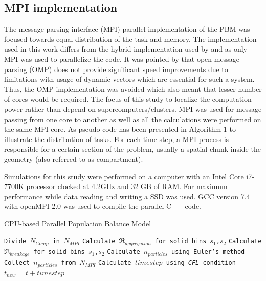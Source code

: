 \documentclass[preprint,10pt,authoryear,review]{elsarticle}
\begin{document}
\begin{linenumbers}
\subsection{MPI implementation}
The message parsing interface (MPI) parallel implementation of the PBM was 
focused towards equal distribution of the task and memory. The implementation 
used in this work differs from the hybrid implementation used by \citep{Bettencourt2017}
and \citep{Sampat2018} as only MPI was used to parallelize the code. It 
was pointed by \citep{Sampat2018} that open message parsing (OMP) does not 
provide significant speed improvements due to limitations with usage of 
dynamic vectors which are essential for such a system. Thus, the OMP 
implementation was avoided which also meant that lesser number of cores 
would be required. The focus of this study to localize the computation power 
rather than depend on supercomputers/clusters. MPI was used for message passing 
from one core to another as well as all the calculations  
were performed on the same MPI core. As pseudo code has been presented in Algorithm 1 
to illustrate the distribution of tasks. For each time step, a MPI process is responsible 
for a certain section of the problem, usually a spatial chunk inside the geometry 
(also referred to as compartment).  



Simulations for this study were performed on a computer with an Intel Core i7-7700K 
processor clocked at 4.2GHz and 32 GB of RAM. For maximum performance while 
data reading and writing a SSD was used. GCC version 7.4 with openMPI 2.0 
was used to compile the parallel C++ code.

\begin{algorithm}
     \scriptsize
     \caption{CPU-based Parallel Population Balance Model}
     \label{alg:CPUparallelPBM}
     \begin{algorithmic}[1]
     \State \texttt{Divide $N_{Comp}$ in $N_{MPI}$}
     \State \texttt{Calculate $\Re_{aggregation}$ for solid bins $s_1$,$s_2$}
     \State \texttt{Calculate $\Re_{breakage}$ for solid bins $s_1$,$s_2$}
     \State \texttt{Calculate $n_{particles}$ using Euler's method}
     \EndFor
     \State \texttt{Collect $n_{particles}$ from $N_{MPI}$}
     \State \texttt{Calculate $timestep$ using \textit{CFL} condition}
     \State \texttt{$t_{new} = t + timestep$ }
     \EndWhile
     \EndProcedure
     \end{algorithmic}
 \label{alg:parpbm}
 \end{algorithm}   





\end{linenumbers}
\end{document}
